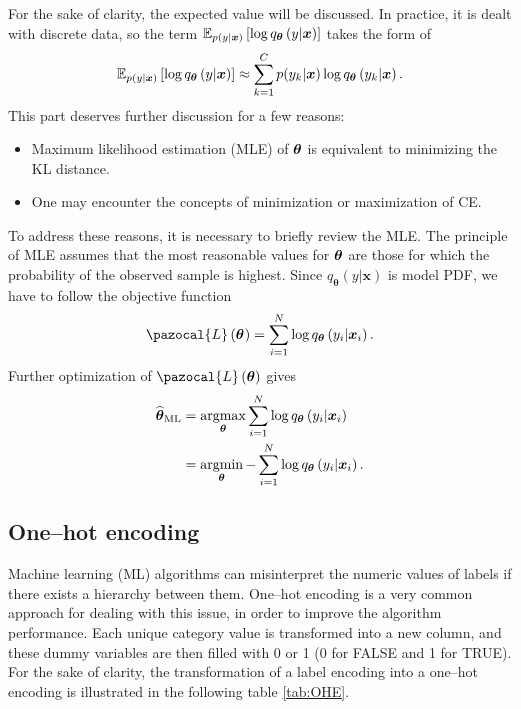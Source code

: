For the sake of clarity, the expected value will be discussed. In practice, it is dealt with discrete data, so the term $\mathbb{E}_{ p(y| \boldsymbol{x})}\left[\log q_{\boldsymbol{\theta}}\left(y|\boldsymbol{x}\right)\right]$ takes the form of
\begin{equation}
    \mathbb{E}_{p(y| \boldsymbol{x})}\left[\log q_{\boldsymbol{\theta}}\left(y|\boldsymbol{x}\right)\right] \approx \sum_{k=1}^C p(y_k| \boldsymbol{x})\log q_{\boldsymbol{\theta}}\left(y_k|\boldsymbol{x}\right).
\end{equation}
This part deserves further discussion for a few reasons:
\begin{itemize}
    \item Maximum likelihood estimation (MLE) of $\boldsymbol{\theta}$ is equivalent to minimizing the KL distance.
    \item One may encounter the concepts of minimization or maximization of CE.
\end{itemize}
To address these reasons, it is necessary to briefly review the MLE. The principle of MLE assumes that the most reasonable
values for $\boldsymbol{\theta}$ are those for which the probability of the observed sample is
highest. Since $q_{\boldsymbol{\theta}}\left(y|\boldsymbol{x}\right)$ is model PDF, we have to follow the objective function
\begin{equation}
   \pazocal{L}\left(\bt^{}\right)= \sum_{i=1}^{N}\log q_{\boldsymbol{\theta}}\left(y_i|\boldsymbol{x}_i\right).
\end{equation}
Further optimization of $\pazocal{L}\left(\bt\right)$ gives 
\begin{align}
    \widehat{\boldsymbol{\theta}}_{\mathrm{ML}} &= \mathop{\mathrm{argmax}}_{\boldsymbol{\theta}} \sum_{i=1}^{N}\log q_{\boldsymbol{\theta}}\left(y_i|\boldsymbol{x}_i\right)\\  
    &=\mathop{\mathrm{argmin}}_{\boldsymbol{\theta}} -\sum_{i=1}^{N}\log q_{\boldsymbol{\theta}}\left(y_i|\boldsymbol{x}_i\right).
\end{align}

\subsection{One--hot encoding}\label{OHE}
 Machine learning (ML) algorithms can misinterpret the numeric values of labels if there exists a hierarchy between them. One--hot encoding is a very common approach for dealing with this issue, in order to improve the algorithm performance. Each unique category value is transformed into a new column, and these dummy variables are then filled with 0 or 1 (0 for FALSE and 1 for TRUE). For the sake of clarity, the transformation of a label encoding into a one--hot encoding is illustrated in the following table \ref{tab:OHE}. 
 
